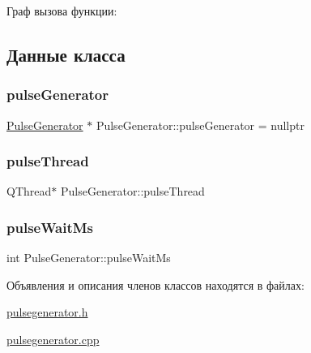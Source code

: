Граф вызова функции\+:


\subsection{Данные класса}
\mbox{\label{class_pulse_generator_a1a0a42b3139fc981379e0d3bfe82faab}} 
\subsubsection{\texorpdfstring{pulse\+Generator}{pulseGenerator}}
{\footnotesize\ttfamily \hyperlink{class_pulse_generator}{Pulse\+Generator} $\ast$ Pulse\+Generator\+::pulse\+Generator = nullptr\hspace{0.3cm}{\ttfamily [static]}}

\mbox{\label{class_pulse_generator_af72b1e26b8a88613a2e0412e6d497a40}} 
\subsubsection{\texorpdfstring{pulse\+Thread}{pulseThread}}
{\footnotesize\ttfamily Q\+Thread$\ast$ Pulse\+Generator\+::pulse\+Thread}

\mbox{\label{class_pulse_generator_a18f67c580cb5e9acc3e53f8fdb828128}} 
\subsubsection{\texorpdfstring{pulse\+Wait\+Ms}{pulseWaitMs}}
{\footnotesize\ttfamily int Pulse\+Generator\+::pulse\+Wait\+Ms}



Объявления и описания членов классов находятся в файлах\+:\begin{DoxyCompactItemize}
\item 
\hyperlink{pulsegenerator_8h}{pulsegenerator.\+h}\item 
\hyperlink{pulsegenerator_8cpp}{pulsegenerator.\+cpp}\end{DoxyCompactItemize}
